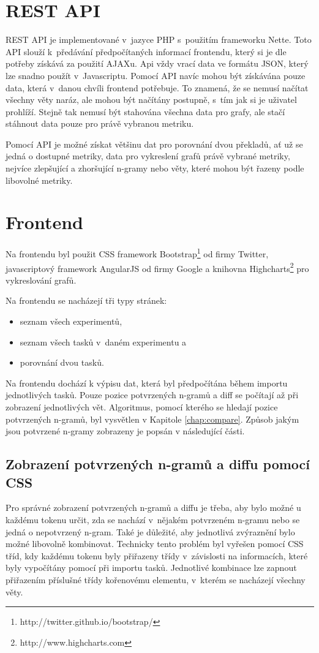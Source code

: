 \section{REST API}
REST API je implementované v~jazyce PHP s~použitím frameworku Nette.
Toto API slouží k~předávání předpočítaných informací frontendu,
  který si je dle potřeby získává za použití AJAXu.
Api vždy vrací data ve formátu JSON,
  který lze snadno použít v~Javascriptu.
Pomocí API navíc mohou být získávána pouze data,
  která v~danou chvíli frontend potřebuje.
To znamená, že se nemusí načítat všechny věty naráz,
  ale mohou být načítány postupně,
  s~tím jak si je uživatel prohlíží.
Stejně tak nemusí být stahována všechna data pro grafy,
  ale stačí stáhnout data pouze pro právě vybranou metriku.

Pomocí API je možné získat většinu dat pro porovnání dvou překladů,
  ať už se jedná o dostupné metriky,
  data pro vykreslení grafů právě vybrané metriky,
  nejvíce zlepšující a zhoršující \mbox{n-gramy}
  nebo věty,
  které mohou být řazeny podle libovolné metriky.

\section{Frontend}
Na frontendu byl použit CSS framework Bootstrap\footnote{http://twitter.github.io/bootstrap/} od firmy Twitter,
  javascriptový framework AngularJS od firmy Google
  a knihovna Highcharts\footnote{http://www.highcharts.com} pro vykreslování grafů.

Na frontendu se nacházejí tři typy stránek:
\begin{itemize}
  \item seznam všech experimentů,
  \item seznam všech tasků v~daném experimentu a
  \item porovnání dvou tasků.
\end{itemize}

Na frontendu dochází k výpisu dat, která byl předpočítána během importu jednotlivých tasků.
Pouze pozice potvrzených n-gramů a diff se počítají až při zobrazení jednotlivých vět.
Algoritmus, pomocí kterého se hledají pozice potvrzených \mbox{n-gramů}, byl vysvětlen v Kapitole \ref{chap:compare}.
Způsob jakým jsou potvrzené \mbox{n-gramy} zobrazeny je popsán v následující části.

\subsection{Zobrazení potvrzených \mbox{n-gramů} a diffu pomocí CSS}
Pro správné zobrazení potvrzených \mbox{n-gramů} a diffu je třeba,
  aby bylo možné u každému tokenu určit,
  zda se nachází v~nějakém potvrzeném \mbox{n-gramu} nebo se jedná o nepotvrzený \mbox{n-gram}.
Také je důležité,
  aby jednotlivá zvýraznění bylo možné libovolně kombinovat.
Technicky tento problém byl vyřešen pomocí CSS tříd,
  kdy každému tokenu byly přiřazeny třídy v~závislosti na informacích,
  které byly vypočítány pomocí při importu tasků.
Jednotlivé kombinace lze zapnout přiřazením příslušné třídy kořenovému elementu,
  v~kterém se nacházejí všechny věty.

